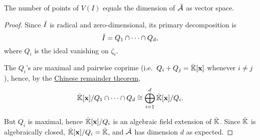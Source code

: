 \begin{proposition}
  The number of points of $V(I)$ equals the dimension of
  $\bar{\mathcal{A}}$ as vector space.
\end{proposition}
\begin{proof}
  Since $\bar{I}$ is radical and zero-dimensional, its primary
  decomposition is
  \begin{equation}
    \label{eq:1}
    \bar{I}=Q_1\cap \cdots \cap Q_d
    \text{,}
  \end{equation}
  where $Q_i$ is the ideal vanishing on $\zeta_i$.
  
  The $Q_i$'s are maximal and pairwise coprime
  (i.e.\ $Q_i+Q_j=\bar{\mathbb{K}}[\mathbf{x}]$ whenever $i\ne j$), hence, by the
  \hyperref[th:chinese-remainder]{Chinese remainder theorem},
  \begin{equation}
    \label{eq:3}
    \bar{\mathbb{K}}[\mathbf{x}]/Q_1\cap\cdots\cap Q_d \cong \bigoplus_{i=1}^d\bar{\mathbb{K}}[\mathbf{x}]/Q_i
    \text{.}
  \end{equation}

  But $Q_i$ is maximal, hence $\bar{\mathbb{K}}[\mathbf{x}]/Q_i$ is an algebraic
  field extension of $\bar{\mathbb{K}}$. Since $\bar{\mathbb{K}}$ is algebraically
  closed, $\bar{\mathbb{K}}[\mathbf{x}]/Q_i=\bar{\mathbb{K}}$, and $\bar{\mathcal{A}}$ has
  dimension $d$ as expected.
\end{proof}


